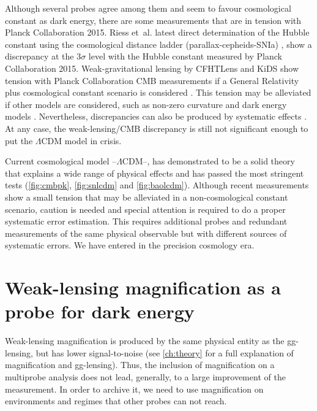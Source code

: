 Although several probes agree among them and seem to favour cosmological constant as dark energy, there are some measurements that are in tension with Planck Collaboration 2015. Riess et~al. latest direct determination of the Hubble constant using the cosmological distance ladder (parallax-cepheids-SNIa) \cite{2016ApJ...826...56R}, show a discrepancy at the $3\sigma$ level with the Hubble constant measured by Planck Collaboration 2015. Weak-gravitational lensing  by CFHTLens and KiDS show tension with Planck Collaboration CMB measurements if a General Relativity plus cosmological constant scenario is considered \cite{2013MNRAS.430.2200K,2017arXiv170303383H,2017MNRAS.467.3024L}. This tension may be alleviated if other models are considered, such as non-zero curvature and dark energy models \cite{2016arXiv161004606J,2017arXiv170400762D,2017arXiv170108165Z}. Nevertheless, discrepancies can also be produced by systematic effects \cite{2015PhRvD..92b3003D,2017MNRAS.465.2033J}. At any case, the weak-lensing/CMB discrepancy is still not significant enough to put the $\Lambda$CDM model in crisis.
\newline

Current cosmological model --$\Lambda$CDM--, has demonstrated to be a solid theory that explains a wide range of physical effects and has passed the most stringent tests (\autoref{fig:cmbpk}, \autoref{fig:snlcdm} and \autoref{fig:baolcdm}). Although recent measurements show a small tension that may be alleviated in a  non-cosmological constant scenario, caution is needed and special attention is required to do a proper systematic error estimation. This requires additional probes and redundant measurements of the same physical observable but with different sources of systematic errors. We have entered in the precision cosmology era.

\section{Weak-lensing magnification as a probe for dark energy}
Weak-lensing magnification is produced by the same physical entity as the gg-lensing, but has lower signal-to-noise (see \autoref{ch:theory} for a full explanation of magnification and gg-lensing). Thus, the inclusion of magnification on a multiprobe analysis does not lead, generally, to a large improvement of the measurement. In order to archive it, we need to use magnification on environments and regimes that other probes can not reach. 
\newline

